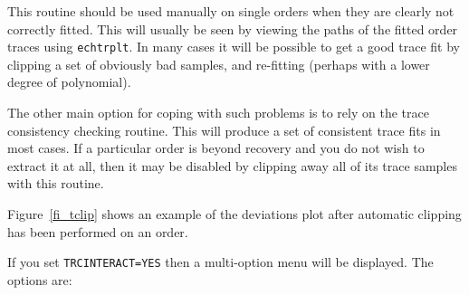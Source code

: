 \documentclass[twoside,11pt]{article}
\newcommand{\htmlref}[2]{#1}
\renewcommand{\_}{\texttt{\symbol{95}}}
\newcommand{\sunspec}[2]{#1}
\newcommand{\myindex}[1]{\index{#1}}
\newcommand{\sunspec}[2]{#2}
\newcommand{\myindex}[1]{}
\begin{document}
This routine should be used manually on single orders when they are
clearly not correctly fitted. This will usually be seen by viewing the
paths of the fitted order traces using
\htmlref{{\tt ech\_trplt}}{ech_trplt}\@. In many cases
it will be possible to get a good trace fit by clipping a set of obviously
bad samples, and re-fitting (perhaps with a lower degree of polynomial).

The other main option for coping with such problems is to rely on the trace
consistency checking routine.  This will produce a set of consistent
trace fits in most cases.
\myindex{Order!disabling}
If a particular order is beyond recovery and you do not wish to extract it
at all, then it may be disabled by clipping away all of its trace samples
with this routine.

\sunspec{Figure~\ref{fi_tclip}}{The figure above}
shows an example of the deviations plot after
automatic clipping has been performed on an order.

If you set {\tt TRC\_INTERACT=YES} then a multi-option menu will be displayed.
The options are:
\end{document}
